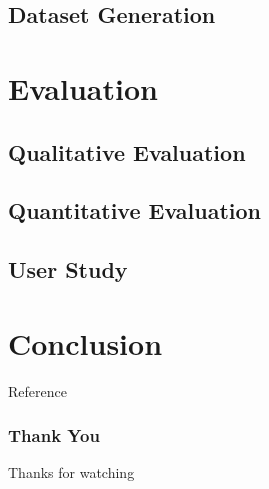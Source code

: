 \documentclass{njupre/njupre}
\begin{document}
\subsection{Dataset Generation}


\section{Evaluation}
\subsection{Qualitative Evaluation}

\subsection{Quantitative Evaluation}

\subsection{User Study}


\section{Conclusion}


\begin{frame}[allowframebreaks]{Reference}
    
    
\end{frame}
\begin{frame}
    \frametitle{Thank You}
    Thanks for watching
\end{frame}
\end{document}
